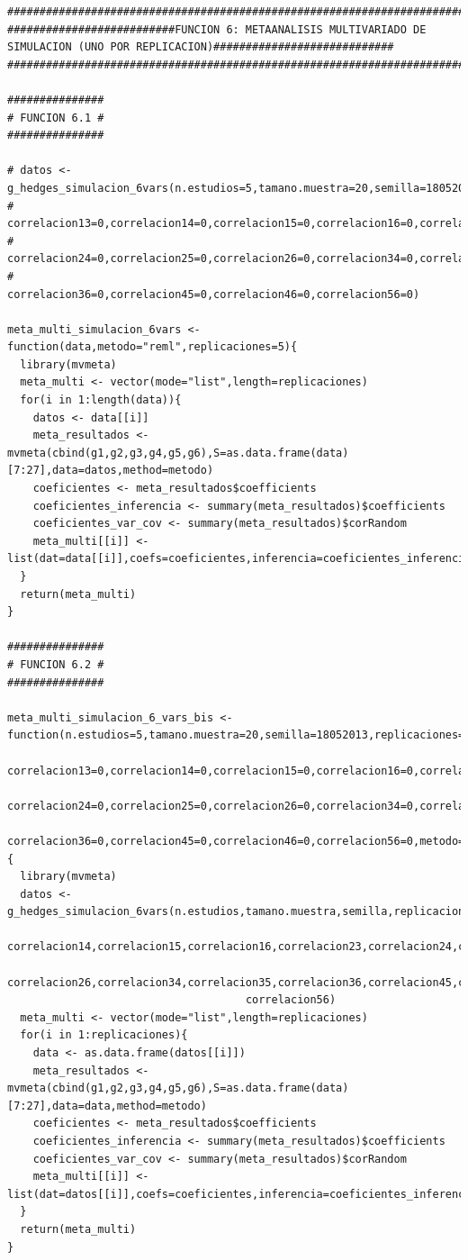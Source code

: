 \documentclass[a4paper,openright,12pt]{report}
\begin{document}
{\begin{verbatim}
##############################################################################################################################
##########################FUNCION 6: METAANALISIS MULTIVARIADO DE SIMULACION (UNO POR REPLICACION)############################
##############################################################################################################################

###############
# FUNCION 6.1 #
###############

# datos <- g_hedges_simulacion_6vars(n.estudios=5,tamano.muestra=20,semilla=18052013,replicaciones=5,correlacion12=0,
#                                    correlacion13=0,correlacion14=0,correlacion15=0,correlacion16=0,correlacion23=0,
#                                    correlacion24=0,correlacion25=0,correlacion26=0,correlacion34=0,correlacion35=0,
#                                    correlacion36=0,correlacion45=0,correlacion46=0,correlacion56=0)

meta_multi_simulacion_6vars <- function(data,metodo="reml",replicaciones=5){
  library(mvmeta)
  meta_multi <- vector(mode="list",length=replicaciones)
  for(i in 1:length(data)){
    datos <- data[[i]]
    meta_resultados <- mvmeta(cbind(g1,g2,g3,g4,g5,g6),S=as.data.frame(data)[7:27],data=datos,method=metodo)
    coeficientes <- meta_resultados$coefficients
    coeficientes_inferencia <- summary(meta_resultados)$coefficients
    coeficientes_var_cov <- summary(meta_resultados)$corRandom
    meta_multi[[i]] <- list(dat=data[[i]],coefs=coeficientes,inferencia=coeficientes_inferencia,var_cov=coeficientes_var_cov)
  }
  return(meta_multi)  
}

###############
# FUNCION 6.2 #
###############

meta_multi_simulacion_6_vars_bis <- function(n.estudios=5,tamano.muestra=20,semilla=18052013,replicaciones=5,correlacion12=0,
                                             correlacion13=0,correlacion14=0,correlacion15=0,correlacion16=0,correlacion23=0,
                                             correlacion24=0,correlacion25=0,correlacion26=0,correlacion34=0,correlacion35=0,
                                             correlacion36=0,correlacion45=0,correlacion46=0,correlacion56=0,metodo="reml"){
  library(mvmeta)
  datos <- g_hedges_simulacion_6vars(n.estudios,tamano.muestra,semilla,replicaciones,correlacion12,correlacion13,
                                     correlacion14,correlacion15,correlacion16,correlacion23,correlacion24,correlacion25,
                                     correlacion26,correlacion34,correlacion35,correlacion36,correlacion45,correlacion46,
                                     correlacion56)
  meta_multi <- vector(mode="list",length=replicaciones)
  for(i in 1:replicaciones){
    data <- as.data.frame(datos[[i]])
    meta_resultados <- mvmeta(cbind(g1,g2,g3,g4,g5,g6),S=as.data.frame(data)[7:27],data=data,method=metodo)
    coeficientes <- meta_resultados$coefficients
    coeficientes_inferencia <- summary(meta_resultados)$coefficients
    coeficientes_var_cov <- summary(meta_resultados)$corRandom
    meta_multi[[i]] <- list(dat=datos[[i]],coefs=coeficientes,inferencia=coeficientes_inferencia,var_cov=coeficientes_var_cov)
  }
  return(meta_multi)  
}
\end{verbatim}}
\end{document}
